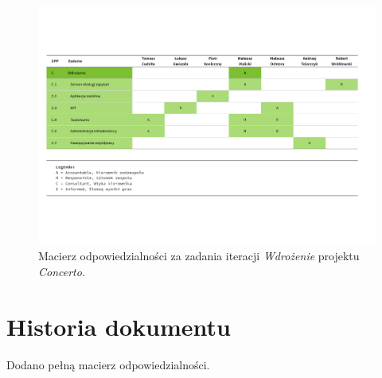 \documentclass[10pt]{dokument-ppi}
\begin{document}
\begin{figure}[p]
    \ContinuedFloat
    \includegraphics[angle=270, trim=1cm 1cm 1cm 1cm, width=\textwidth]{./figury/macierz-odpowiedzialnosci-C-wdrozenie}
    \caption[]{Macierz odpowiedzialności za zadania iteracji \emph{Wdrożenie} projektu \emph{Concerto}.}
\end{figure}


\section{Historia dokumentu}
\begin{versions}
        Dodano pełną macierz odpowiedzialności.
\end{versions}
\end{document}

